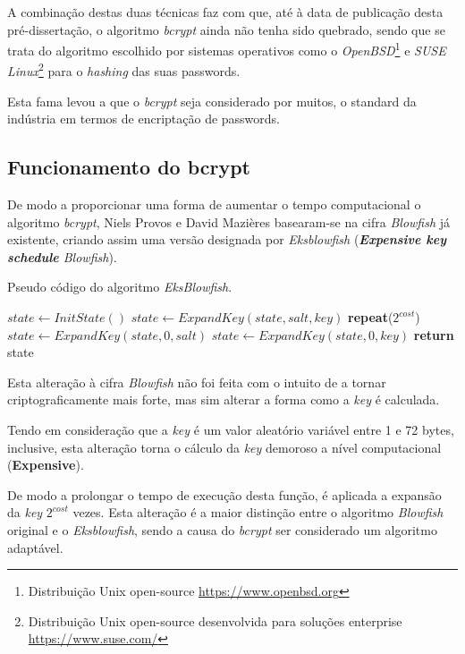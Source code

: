A combinação destas duas técnicas faz com que, até à data de publicação desta pré-dissertação, o algoritmo \emph{bcrypt} ainda não tenha sido quebrado, sendo que se trata do algoritmo escolhido por sistemas operativos como o \emph{OpenBSD}\footnote{Distribuição Unix open-source \url{https://www.openbsd.org}} e \emph{SUSE Linux}\footnote{Distribuição Unix open-source desenvolvida para soluções enterprise \url{https://www.suse.com/}} para o \emph{hashing} das suas passwords.

Esta fama levou a que o \emph{bcrypt} seja considerado por muitos, o standard da indústria em termos de encriptação de passwords.

\subsection{Funcionamento do bcrypt}

De modo a proporcionar uma forma de aumentar o tempo computacional o algoritmo \emph{bcrypt}, Niels Provos e David Mazières basearam-se na cifra \emph{Blowfish} já existente, criando assim uma versão designada por \emph{Eksblowfish} (\textit{\textbf{Expensive key schedule} Blowfish}).

\begin{algorithm}
    \caption{Pseudo código do algoritmo \emph{EksBlowfish}.}
    \begin{algorithmic}[1]
        \State $state\gets InitState()$
        \State $state\gets ExpandKey(state, salt, key)$
        \State \textbf{repeat}($2^{cost}$)
        \State \indent $state\gets ExpandKey(state, 0, salt)$
        \State \indent $state\gets ExpandKey(state, 0, key)$
        \State \textbf{return} state
    \EndFunction
    \end{algorithmic}
\end{algorithm}

Esta alteração à cifra \emph{Blowfish} não foi feita com o intuito de a tornar criptograficamente mais forte, mas sim alterar a forma como a \emph{key} é calculada.

Tendo em consideração que a \emph{key} é um valor aleatório variável entre 1 e 72 bytes, inclusive, esta alteração torna o cálculo da \emph{key} demoroso a nível computacional (\textbf{Expensive}).

De modo a prolongar o tempo de execução desta função, é aplicada a expansão da \emph{key} $2^{cost}$ vezes. Esta alteração é a maior distinção entre o algoritmo \emph{Blowfish} original e o \emph{Eksblowfish}, sendo a causa do \emph{bcrypt} ser considerado um algoritmo adaptável.

